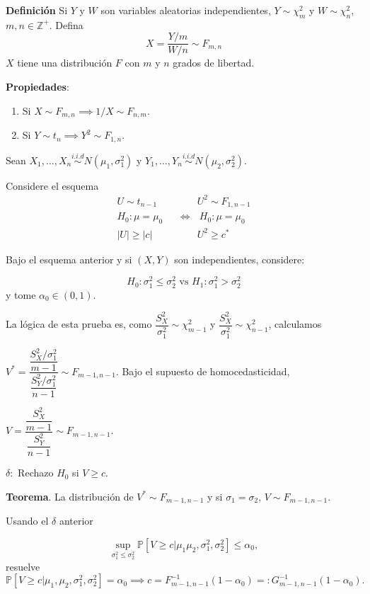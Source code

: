 \documentclass[
  12pt,
]{book}
\begin{document}
\textbf{Definición} Si \(Y\) y \(W\) son variables aleatorias independientes, \(Y\sim \chi^2_m\) y \(W\sim \chi ^2_n\), \(m,n\in \mathbb Z^+\). Defina
\[X = \dfrac{Y/m}{W/n}\sim F_{m,n}\]
\(X\) tiene una distribución \(F\) con \(m\) y \(n\) grados de libertad.

\textbf{Propiedades}:

\begin{enumerate}
\def\labelenumi{\arabic{enumi}.}
\item
  Si \(X\sim F_{m,n} \implies 1/X\sim F_{n,m}\).
\item
  Si \(Y\sim t_n \implies Y^2\sim F_{1,n}\).
\end{enumerate}

Sean \(X_1,\dots, X_n\overset{i.i.d}{\sim} N(\mu_1,\sigma_1^2)\) y \(Y_1,\dots, Y_n\overset{i.i.d}{\sim} N(\mu_2,\sigma_2^2)\).

Considere el esquema
\begin{align*}
U\sim t_{n-1}\text{  }& \quad \quad U^2\sim F_{1,n-1}\\
H_0: \mu=\mu_0\text{  } & \Leftrightarrow \text{  }  H_0: \mu=\mu_0 \\
|U|\geq |c|\text{  } & \quad \quad  U^2\geq c^* 
\end{align*}

Bajo el esquema anterior y si \((X,Y)\) son independientes, considere:

\[H_0: \sigma_1^2\leq \sigma_2^2 \text { vs } H_1: \sigma_1^2> \sigma_2^2 \]
y tome \(\alpha_0 \in (0,1)\).

La lógica de esta prueba es, como \(\dfrac{S_X^2}{\sigma_1^2} \sim \chi^2_{m-1}\) y \(\dfrac{S_X^2}{\sigma_1^2} \sim \chi^2_{n-1}\), calculamos

\(V^* = \dfrac{\dfrac{S_X^2/\sigma_1^2}{m-1}}{\dfrac{S_Y^2/\sigma_1^2}{n-1}}\sim F_{m-1,n-1}\).
Bajo el supuesto de homocedasticidad,

\(V = \dfrac{\dfrac{S_X^2}{m-1}}{\dfrac{S_Y^2}{n-1}}\sim F_{m-1,n-1}\).

\(\delta:\) Rechazo \(H_0\) si \(V\geq c\).

\textbf{Teorema}. La distribución de \(V^*\sim F_{m-1,n-1}\) y si \(\sigma_1=\sigma_2\), \(V \sim F_{m-1,n-1}\).

Usando el \(\delta\) anterior

\[\sup_{\sigma_1^2\leq\sigma^2_2}\mathbb P[V\geq c|\mu_1\mu_2,\sigma^2_1,\sigma_2^2]\leq \alpha_0,\]
resuelve
\[\mathbb P[V\geq c|\mu_1,\mu_2,\sigma_1^2,\sigma_2^2] = \alpha_0 \implies c = F^{-1}_{m-1,n-1}(1-\alpha_0) =: G^{-1}_{m-1,n-1}(1-\alpha_0).\]
\end{document}
